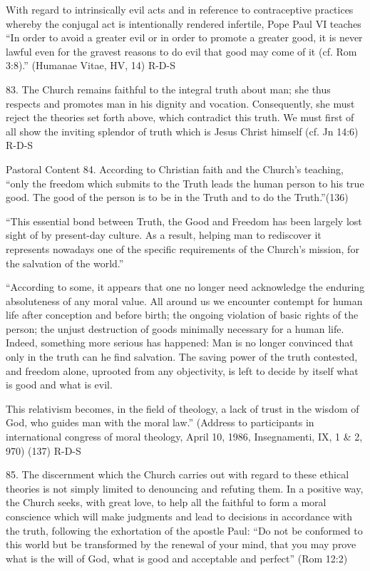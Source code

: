 \documentclass[oneside]{book}
\begin{document}
With regard to intrinsically evil acts and in reference to contraceptive
practices whereby the conjugal act is intentionally rendered infertile, Pope
Paul VI teaches ``In order to avoid a greater evil or in order to promote a
greater good, it is never lawful even for the gravest reasons to do evil that
good may come of it (cf. Rom 3:8).'' (Humanae Vitae, HV, 14)
R-D-S

83. The Church remains faithful to the integral truth about man; she thus
respects and promotes man in his dignity and vocation. Consequently, she must
reject the theories set forth above, which contradict this truth. We must first
of all show the inviting splendor of truth which is Jesus Christ himself (cf. Jn
14:6)
R-D-S

Pastoral Content
84. According to Christian faith and the Church's teaching, ``only the freedom
which submits to the Truth leads the human person to his true good. The good of
the person is to be in the Truth and to do the Truth.''(136)

``This essential bond between Truth, the Good and Freedom has been largely lost
sight of by present-day culture. As a result, helping man to rediscover it
represents nowadays one of the specific requirements of the Church's mission,
for the salvation of the world.''

``According to some, it appears that one no longer need acknowledge the enduring
absoluteness of any moral value. All around us we encounter contempt for human
life after conception and before birth; the ongoing violation of basic rights of
the person; the unjust destruction of goods minimally necessary for a human
life. Indeed, something more serious has happened: Man is no longer convinced
that only in the truth can he find salvation. The saving power of the truth
contested, and freedom alone, uprooted from any objectivity, is left to decide
by itself what is good and what is evil.

This relativism becomes, in the field of theology, a lack of trust in the wisdom
of God, who guides man with the moral law.'' (Address to participants in
international congress of moral theology, April 10, 1986, Insegnamenti, IX, 1 \&
2, 970) (137)
R-D-S

85. The discernment which the Church carries out with regard to these ethical
theories is not simply limited to denouncing and refuting them. In a positive
way, the Church seeks, with great love, to help all the faithful to form a moral
conscience which will make judgments and lead to decisions in accordance with
the truth, following the exhortation of the apostle Paul: ``Do not be conformed
to this world but be transformed by the renewal of your mind, that you may prove
what is the will of God, what is good and acceptable and perfect'' (Rom 12:2)
\end{document}
